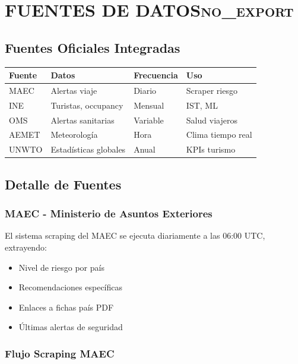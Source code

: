 \documentclass[11pt]{article}
\begin{document}
\section{FUENTES DE DATOS\hfill{}\textsc{no\_export}}
\label{sec:org4c806f0}
\subsection{Fuentes Oficiales Integradas}
\label{sec:org34948df}

\begin{center}
\begin{tabular}{llll}
Fuente & Datos & Frecuencia & Uso\\
\hline
MAEC & Alertas viaje & Diario & Scraper riesgo\\
INE & Turistas, occupancy & Mensual & IST, ML\\
OMS & Alertas sanitarias & Variable & Salud viajeros\\
AEMET & Meteorología & Hora & Clima tiempo real\\
UNWTO & Estadísticas globales & Anual & KPIs turismo\\
\end{tabular}
\end{center}

\subsection{Detalle de Fuentes}
\label{sec:org65a2589}

\subsubsection{MAEC - Ministerio de Asuntos Exteriores}
\label{sec:org7c8d67d}

El sistema scraping del MAEC se ejecuta diariamente a las 06:00 UTC, extrayendo:
\begin{itemize}
\item Nivel de riesgo por país
\item Recomendaciones específicas
\item Enlaces a fichas país PDF
\item Últimas alertas de seguridad
\end{itemize}

\subsubsection{Flujo Scraping MAEC}
\label{sec:org9973216}
\end{document}

